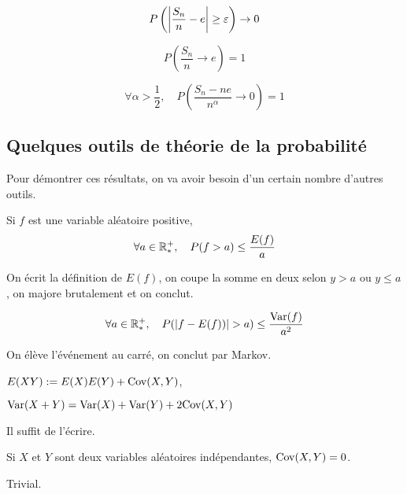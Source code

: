 \documentclass[10pt,a4paper,notitlepage ]{report}
\begin{document}
\begin{theorem}
	\[P\left(\left| \frac{S_n} n -e \right| \ge \varepsilon\right) \rightarrow 0\]
\end{theorem}

\begin{theorem}
	\[P \left(\frac {S_n} n \rightarrow e\right) = 1\]
\end{theorem}

\begin{theorem}
	\[\forall \alpha > \frac 1 2, \quad P\left(\frac {S_n - ne} {n^\alpha} \rightarrow 0\right) = 1\]
\end{theorem}

\subsection{Quelques outils de théorie de la probabilité}

Pour démontrer ces résultats, on va avoir besoin d'un certain nombre d'autres outils.

\begin{theorem}
	Si $f$ est une variable aléatoire positive, 
	\[ \forall a \in \mathbb R^+_*, \quad P(f > a) \le \frac {E(f)} a \]
\end{theorem}

\begin{demo}
	On écrit la définition de $E(f)$, on coupe la somme en deux selon $y>a$ ou $y \le a$, on majore brutalement et on conclut.
\end{demo}

\begin{theorem}
	\[ \forall a \in \mathbb R^+_*, \quad P(|f-E(f))| > a) \le \frac {\mathrm{Var}(f)} {a^2} \]
\end{theorem}

\begin{demo}
	On élève l'événement au carré, on conclut par Markov.
\end{demo}

\begin{propriete}
	$E(XY) := E(X)E(Y) + \mathrm{Cov} (X,Y)$,
	
	$\mathrm{Var}(X+Y) = \mathrm{Var}(X) + \mathrm{Var}(Y) + 2\mathrm{Cov} (X,Y)$
\end{propriete}

\begin{demo}
	Il suffit de l'écrire.
\end{demo}

\begin{lemme}
	Si $X$ et $Y$ sont deux variables aléatoires indépendantes, $\mathrm{Cov}(X,Y) = 0$.
\end{lemme}
\begin{demo}
	Trivial.
\end{demo}
\end{document}
